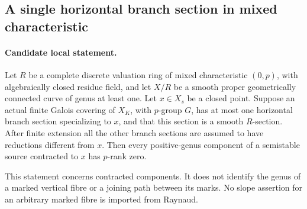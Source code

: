 \subsection{A single horizontal branch section in mixed characteristic}

\paragraph{Candidate local statement.}
Let \(R\) be a complete discrete valuation ring of mixed
characteristic \((0,p)\), with algebraically closed residue field,
and let \(X/R\) be a smooth proper geometrically connected curve
of genus at least one. Let \(x\in X_s\) be a closed point.
Suppose an actual finite Galois covering of \(X_K\), with
\(p\)-group \(G\), has at most one horizontal branch section
specializing to \(x\), and that this section is a smooth
\(R\)-section. After finite extension all the other branch
sections are assumed to have reductions different from \(x\).
Then every positive-genus component of a semistable source
contracted to \(x\) has \(p\)-rank zero.

This statement concerns contracted components. It does not
identify the genus of a marked vertical fibre or a joining
path between its marks. No slope assertion for an arbitrary
marked fibre is imported from Raynaud.

